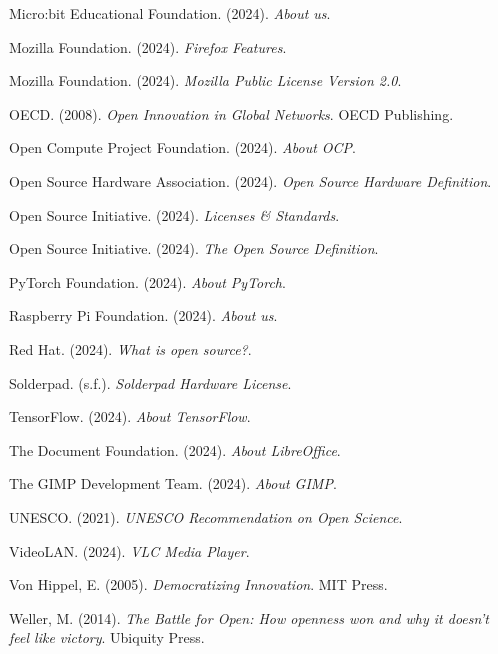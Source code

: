 \documentclass[12pt]{article}
\begin{document}
	Micro:bit Educational Foundation. (2024). \textit{About us}.
	
	Mozilla Foundation. (2024). \textit{Firefox Features}.
	
	Mozilla Foundation. (2024). \textit{Mozilla Public License Version 2.0}.
	
	OECD. (2008). \textit{Open Innovation in Global Networks}. OECD Publishing.
	
	Open Compute Project Foundation. (2024). \textit{About OCP}.
	
	Open Source Hardware Association. (2024). \textit{Open Source Hardware Definition}.
	
	Open Source Initiative. (2024). \textit{Licenses \& Standards}.
	
	Open Source Initiative. (2024). \textit{The Open Source Definition}.
	
	PyTorch Foundation. (2024). \textit{About PyTorch}.
	
	Raspberry Pi Foundation. (2024). \textit{About us}.
	
	Red Hat. (2024). \textit{What is open source?}.
	
	Solderpad. (s.f.). \textit{Solderpad Hardware License}.
	
	TensorFlow. (2024). \textit{About TensorFlow}.
	
	The Document Foundation. (2024). \textit{About LibreOffice}.
	
	The GIMP Development Team. (2024). \textit{About GIMP}.
	
	UNESCO. (2021). \textit{UNESCO Recommendation on Open Science}.
	
	VideoLAN. (2024). \textit{VLC Media Player}.
	
	Von Hippel, E. (2005). \textit{Democratizing Innovation}. MIT Press.
	
	Weller, M. (2014). \textit{The Battle for Open: How openness won and why it doesn't feel like victory}. Ubiquity Press.
\end{document}
